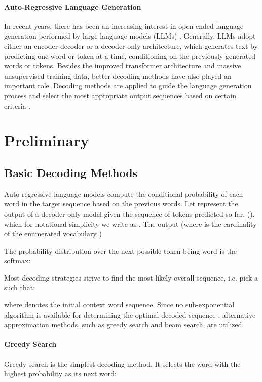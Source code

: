 \documentclass[10.5pt]{article}
\begin{document}
\paragraph{Auto-Regressive Language Generation}
In recent years, there has been an increasing interest in open-ended language generation performed by large language models (LLMs) \cite{gpt4,llama}. Generally, LLMs  adopt either an encoder-decoder \cite{flan_t5} or a decoder-only \cite{gpt3} architecture, which generates text by predicting one word or token at a time, conditioning on the previously generated words or tokens. Besides the improved transformer architecture and massive unsupervised training data, better decoding methods have also played an important role. Decoding methods are applied to guide the language generation process and select the most appropriate output sequences based on certain criteria \cite{seq2seq_learning_with_nn, topk_sampling, topp_sampling}.
\section{Preliminary}

\subsection{Basic Decoding Methods}

Auto-regressive language models compute the conditional probability of each word in the target sequence based on the previous words. Let  represent the output of a decoder-only model given the sequence of tokens predicted so far, (), which for notational simplicity we write as . The output  (where  is the cardinality of the enumerated vocabulary )

The probability distribution over the next possible token being word  is the softmax:


Most decoding strategies strive to find the most likely overall sequence, i.e. pick a  such that:

where  denotes the initial context word sequence. Since no sub-exponential algorithm is available for determining the optimal decoded sequence \cite{chen-etal-2018-recurrent}, alternative approximation methods, such as greedy search and beam search, are utilized.

\paragraph{Greedy Search}
Greedy search is the simplest decoding method. It selects the word with the highest probability as its next word:
\end{document}
